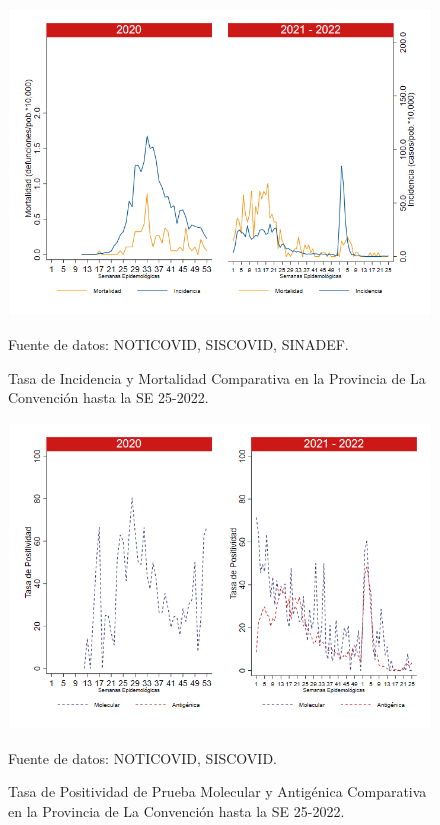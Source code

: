 \documentclass[12pt,a4paper,openany]{book}
\begin{document}
	\begin{figure}[h]
		\caption{Tasa de Incidencia y Mortalidad Comparativa en la Provincia de La Convención hasta la SE 25-2022.}\label{fig:inc_mort_laconv}
		\begin{center}
			\includegraphics[width=0.85\linewidth]{../figuras/incidencia_mortalidad_20_21_9.png}
		\end{center}
		{\footnotesize {Fuente de datos: NOTICOVID, SISCOVID, SINADEF.}}
	\end{figure}
	
	\begin{figure}[h]
		\caption{Tasa de Positividad de Prueba Molecular y Antigénica Comparativa en la Provincia de La Convención hasta la SE 25-2022.}\label{fig:positividad_laconv}
		\begin{center}
			\includegraphics[width=0.7\linewidth]{../figuras/positividad_20_21_9.png}
		\end{center}
		{\footnotesize {Fuente de datos: NOTICOVID, SISCOVID.}}
	\end{figure}
	
\end{document}
